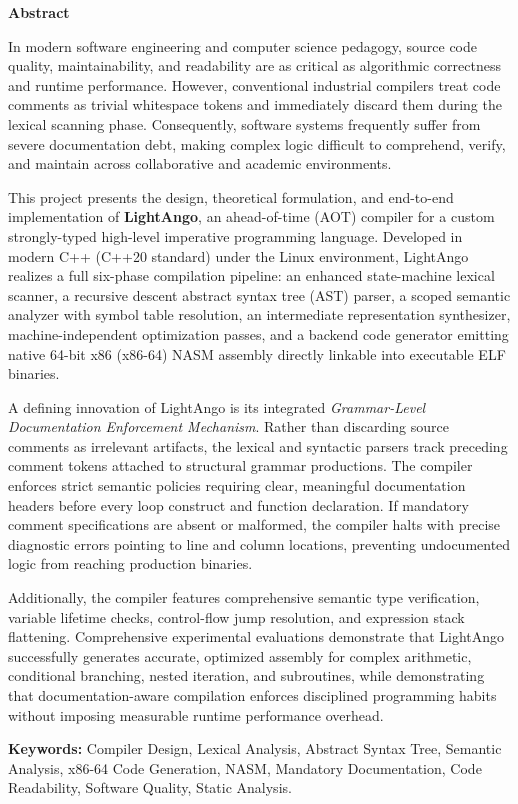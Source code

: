 \thispagestyle{empty}
\newpage
\cleardoublepage{}
{}
\begin{center}
{\Large \bf Abstract}\\
\end{center}
\vspace{10pt}

\noindent
In modern software engineering and computer science pedagogy, source code quality, maintainability, and readability are as critical as algorithmic correctness and runtime performance. However, conventional industrial compilers treat code comments as trivial whitespace tokens and immediately discard them during the lexical scanning phase. Consequently, software systems frequently suffer from severe documentation debt, making complex logic difficult to comprehend, verify, and maintain across collaborative and academic environments.

This project presents the design, theoretical formulation, and end-to-end implementation of \textbf{LightAngo}, an ahead-of-time (AOT) compiler for a custom strongly-typed high-level imperative programming language. Developed in modern C++ (C++20 standard) under the Linux environment, LightAngo realizes a full six-phase compilation pipeline: an enhanced state-machine lexical scanner, a recursive descent abstract syntax tree (AST) parser, a scoped semantic analyzer with symbol table resolution, an intermediate representation synthesizer, machine-independent optimization passes, and a backend code generator emitting native 64-bit x86 (x86-64) NASM assembly directly linkable into executable ELF binaries.

A defining innovation of LightAngo is its integrated \textit{Grammar-Level Documentation Enforcement Mechanism}. Rather than discarding source comments as irrelevant artifacts, the lexical and syntactic parsers track preceding comment tokens attached to structural grammar productions. The compiler enforces strict semantic policies requiring clear, meaningful documentation headers before every loop construct and function declaration. If mandatory comment specifications are absent or malformed, the compiler halts with precise diagnostic errors pointing to line and column locations, preventing undocumented logic from reaching production binaries.

Additionally, the compiler features comprehensive semantic type verification, variable lifetime checks, control-flow jump resolution, and expression stack flattening. Comprehensive experimental evaluations demonstrate that LightAngo successfully generates accurate, optimized assembly for complex arithmetic, conditional branching, nested iteration, and subroutines, while demonstrating that documentation-aware compilation enforces disciplined programming habits without imposing measurable runtime performance overhead.

\vspace{1.0cm}
\noindent
\textbf{Keywords:} Compiler Design, Lexical Analysis, Abstract Syntax Tree, Semantic Analysis, x86-64 Code Generation, NASM, Mandatory Documentation, Code Readability, Software Quality, Static Analysis.
\newpage
\cleardoublepage
